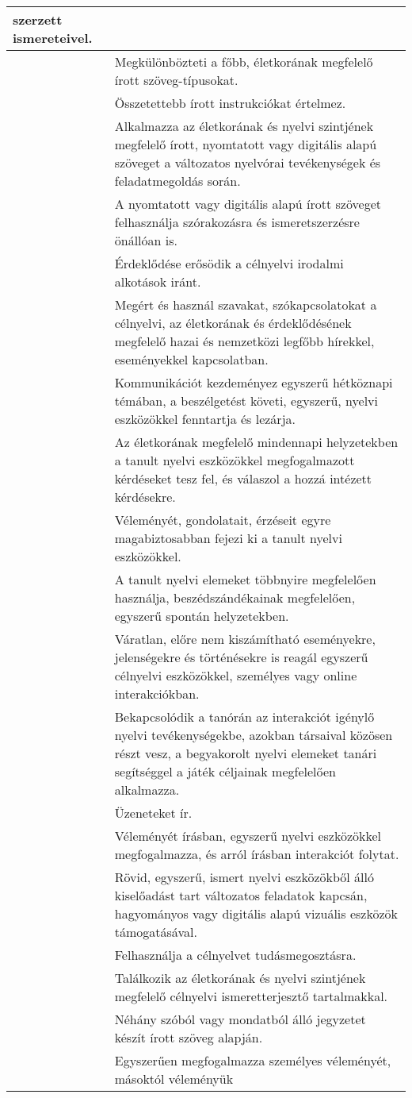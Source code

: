 \begin{longtable}[]{p{\evflength}@{\strut}>{\begin{minipage}{\columnlength}\strut}l<{\strut\end{minipage}}}
  szerzett ismereteivel.
\tabularnewline
\hline
&
  Megkülönbözteti a főbb, életkorának megfelelő írott szöveg-\break típusokat.
\tabularnewline
\hline
&
  Összetettebb írott instrukciókat értelmez.
\tabularnewline
\hline
&
  Alkalmazza az életkorának és nyelvi szintjének megfelelő írott,
  nyomtatott vagy digitális alapú szöveget a változatos nyelvórai
  tevékenységek és feladatmegoldás során.
\tabularnewline
\hline
&
  A nyomtatott vagy digitális alapú írott szöveget felhasználja
  szórakozásra és ismeretszerzésre önállóan is.
\tabularnewline
\hline
&
  Érdeklődése erősödik a célnyelvi irodalmi alkotások iránt.
\tabularnewline
\hline
&
  Megért és használ szavakat, szókapcsolatokat a célnyelvi, az
  életkorának és érdeklődésének megfelelő hazai és nemzetközi legfőbb
  hírekkel, eseményekkel kapcsolatban.
\tabularnewline
\hline
&
  Kommunikációt kezdeményez egyszerű hétköznapi témában, a beszélgetést
  követi, egyszerű, nyelvi eszközökkel fenntartja és lezárja.
\tabularnewline
\hline
&
  Az életkorának megfelelő mindennapi helyzetekben a tanult nyelvi
  eszközökkel megfogalmazott kérdéseket tesz fel, és válaszol a hozzá
  intézett kérdésekre.
\tabularnewline
\hline
&
  Véleményét, gondolatait, érzéseit egyre magabiztosabban fejezi ki a
  tanult nyelvi eszközökkel.
\tabularnewline
\hline
&
  A tanult nyelvi elemeket többnyire megfelelően használja,
  beszédszándékainak megfelelően, egyszerű spontán helyzetekben.
\tabularnewline
\hline
&
  Váratlan, előre nem kiszámítható eseményekre, jelenségekre és
  történésekre is reagál egyszerű célnyelvi eszközökkel, személyes vagy
  online interakciókban.
\tabularnewline
\hline
&
  Bekapcsolódik a tanórán az interakciót igénylő nyelvi tevékenységekbe,
  azokban társaival közösen részt vesz, a begyakorolt nyelvi elemeket
  tanári segítséggel a játék céljainak megfelelően alkalmazza.
\tabularnewline
\hline
&
  Üzeneteket ír.
\tabularnewline
\hline
&
  Véleményét írásban, egyszerű nyelvi eszközökkel megfogalmazza, és
  arról írásban interakciót folytat.
\tabularnewline
\hline
&
  Rövid, egyszerű, ismert nyelvi eszközökből álló kiselőadást tart
  változatos feladatok kapcsán, hagyományos vagy digitális alapú
  vizuális eszközök támogatásával.
\tabularnewline
\hline
&
  Felhasználja a célnyelvet tudásmegosztásra.
\tabularnewline
\hline
&
  Találkozik az életkorának és nyelvi szintjének megfelelő célnyelvi
  ismeretterjesztő tartalmakkal.
\tabularnewline
\hline
&
  Néhány szóból vagy mondatból álló jegyzetet készít írott szöveg
  alapján.
\tabularnewline
\hline
&
  Egyszerűen megfogalmazza személyes véleményét, másoktól véleményük

\end{longtable}
